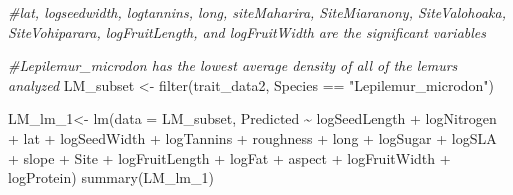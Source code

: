 \documentclass[
  12pt,
]{article}
\newenvironment{Shaded}{\begin{snugshade}}{\end{snugshade}}
\newcommand{\AttributeTok}[1]{\textcolor[rgb]{0.77,0.63,0.00}{#1}}
\newcommand{\CommentTok}[1]{\textcolor[rgb]{0.56,0.35,0.01}{\textit{#1}}}
\newcommand{\FunctionTok}[1]{\textcolor[rgb]{0.00,0.00,0.00}{#1}}
\newcommand{\NormalTok}[1]{#1}
\newcommand{\OtherTok}[1]{\textcolor[rgb]{0.56,0.35,0.01}{#1}}
\newcommand{\SpecialCharTok}[1]{\textcolor[rgb]{0.00,0.00,0.00}{#1}}
\newcommand{\StringTok}[1]{\textcolor[rgb]{0.31,0.60,0.02}{#1}}
\begin{document}
\begin{Shaded}
\begin{Highlighting}[]
\CommentTok{\#lat, logseedwidth, logtannins, long, siteMaharira, SiteMiaranony, SiteValohoaka, SiteVohiparara, logFruitLength, and logFruitWidth are the significant variables}

\CommentTok{\#Lepilemur\_microdon has the lowest average density of all of the lemurs analyzed}
\NormalTok{LM\_subset }\OtherTok{\textless{}{-}} \FunctionTok{filter}\NormalTok{(trait\_data2, Species }\SpecialCharTok{==} \StringTok{"Lepilemur\_microdon"}\NormalTok{)}

\NormalTok{LM\_lm\_1}\OtherTok{\textless{}{-}} \FunctionTok{lm}\NormalTok{(}\AttributeTok{data =}\NormalTok{ LM\_subset, Predicted }\SpecialCharTok{\textasciitilde{}}\NormalTok{ logSeedLength }\SpecialCharTok{+}\NormalTok{ logNitrogen }\SpecialCharTok{+}\NormalTok{ lat }\SpecialCharTok{+}\NormalTok{ logSeedWidth }\SpecialCharTok{+}\NormalTok{ logTannins }\SpecialCharTok{+}\NormalTok{ roughness }\SpecialCharTok{+}\NormalTok{ long }\SpecialCharTok{+}\NormalTok{ logSugar }\SpecialCharTok{+}\NormalTok{ logSLA }\SpecialCharTok{+}\NormalTok{ slope }\SpecialCharTok{+}\NormalTok{ Site }\SpecialCharTok{+}\NormalTok{ logFruitLength }\SpecialCharTok{+}\NormalTok{ logFat }\SpecialCharTok{+}\NormalTok{ aspect }\SpecialCharTok{+}\NormalTok{ logFruitWidth }\SpecialCharTok{+}\NormalTok{ logProtein)}
\FunctionTok{summary}\NormalTok{(LM\_lm\_1)}
\end{Highlighting}
\end{Shaded}
\end{document}

